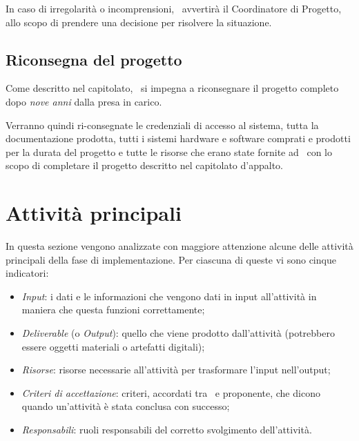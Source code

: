 		In caso di irregolarità o incomprensioni, \azienda~avvertirà il Coordinatore di Progetto, allo scopo di prendere una decisione per risolvere la situazione.
	
	\subsection{Riconsegna del progetto}
	
		Come descritto nel capitolato, \azienda~si impegna a riconsegnare il progetto completo dopo \textit{nove anni} dalla presa in carico.

		Verranno quindi ri-consegnate le credenziali di accesso al sistema, tutta la documentazione prodotta, tutti i sistemi hardware e software comprati e prodotti per la durata del progetto e tutte le risorse che erano state fornite ad \azienda~con lo scopo di completare il progetto descritto nel capitolato d'appalto.

\section{Attività principali}\label{sec:attivita_principali}

	In questa sezione vengono analizzate con maggiore attenzione alcune delle attività principali della fase di implementazione.
	Per ciascuna di queste vi sono cinque indicatori:
	\begin{itemize}[noitemsep]
		\renewcommand\labelitemi{--}

		\item \textit{Input}: i dati e le informazioni che vengono dati in input all'attività in maniera che questa funzioni correttamente;

		\item \textit{Deliverable} (o \textit{Output}): quello che viene prodotto dall'attività (potrebbero essere oggetti materiali o artefatti digitali);

		\item \textit{Risorse}: risorse necessarie all'attività per trasformare l'input nell'output;

		\item \textit{Criteri di accettazione}: criteri, accordati tra \azienda~e proponente, che dicono quando un'attività è stata conclusa con successo; 

		\item \textit{Responsabili}: ruoli responsabili del corretto svolgimento dell'attività.
		
	\end{itemize}

